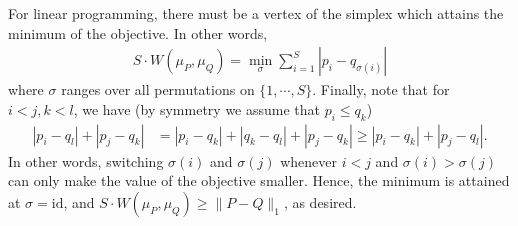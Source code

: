 \documentclass[final,12pt]{colt2018} %
\begin{document}
For linear programming, there must be a vertex of the simplex which attains the minimum of the objective. In other words,
\begin{align*}
S\cdot W(\mu_P,\mu_Q) =  \min_{\sigma} \sum_{i=1}^S |p_i-q_{\sigma(i)}|
\end{align*}
where $\sigma$ ranges over all permutations on $\{1,\cdots,S\}$. Finally, note that for $i<j, k<l$, we have (by symmetry we assume that $p_i\le q_k$)
\begin{align*}
|p_i-q_l| + |p_j-q_k| &= |p_i-q_k| + |q_k-q_l| + |p_j-q_k| \ge |p_i-q_k| + |p_j-q_l|.
\end{align*}
In other words, switching $\sigma(i)$ and $\sigma(j)$ whenever $i<j$ and $\sigma(i)>\sigma(j)$ can only make the value of the objective smaller. Hence, the minimum is attained at $\sigma=\text{id}$, and $S\cdot W(\mu_P,\mu_Q)\ge \|P-Q\|_1$, as desired. 
\end{document}
